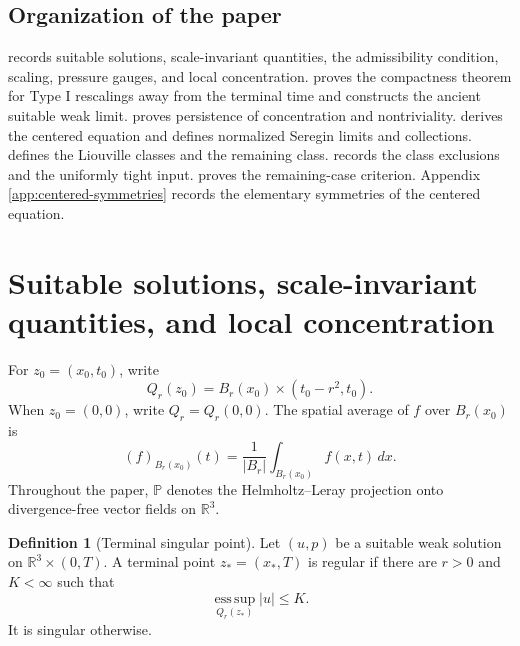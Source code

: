 \documentclass[11pt]{amsart}
\theoremstyle{plain}
\theoremstyle{definition}
\newtheorem{definition}[theorem]{Definition}
\theoremstyle{remark}
\numberwithin{equation}{section}
\newcommand{\R}{\mathbb R}
\newcommand{\esssup}{\operatorname*{ess\,sup}}
\begin{document}
\subsection{Organization of the paper}

 records suitable solutions, scale-invariant quantities,
the admissibility condition, scaling, pressure gauges, and local concentration.
 proves the compactness theorem for Type I
rescalings away from the terminal time and constructs the ancient suitable
weak limit.   proves persistence of concentration and
nontriviality.   derives the centered equation and defines
normalized Seregin limits and collections.   defines the
Liouville classes and the remaining class.   records the
class exclusions and the uniformly tight input.   proves
the remaining-case criterion.  Appendix \ref{app:centered-symmetries} records
the elementary symmetries of the centered equation.

\section{Suitable solutions, scale-invariant quantities, and local concentration}
\label{sec:prelim}

For \(z_0=(x_0,t_0)\), write
\[
   Q_r(z_0)=B_r(x_0)\times(t_0-r^2,t_0).
\]
When \(z_0=(0,0)\), write \(Q_r=Q_r(0,0)\).  The spatial average of \(f\) over
\(B_r(x_0)\) is
\[
   (f)_{B_r(x_0)}(t)=\frac1{|B_r|}\int_{B_r(x_0)}f(x,t)\,dx.
\]
Throughout the paper, \(\mathbb P\) denotes the Helmholtz--Leray projection
onto divergence-free vector fields on \(\R^3\).

\begin{definition}[Terminal singular point]\label{def:terminal-singular}
Let \((u,p)\) be a suitable weak solution on \(\R^3\times(0,T)\).  A terminal
point \(z_*=(x_*,T)\) is regular if there are \(r>0\) and \(K<\infty\) such
that
\[
   \esssup_{Q_r(z_*)}|u|\le K.
\]
It is singular otherwise.
\end{definition}
\end{document}
